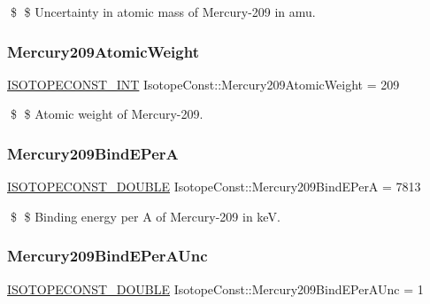\$ \$ Uncertainty in atomic mass of Mercury-\/209 in amu. \mbox{\label{group___isotope_const-_mercury-_hg209_ga2759cde1c7d4021583d5eea3d78fa6d4}} 
\subsubsection{\texorpdfstring{Mercury209\+Atomic\+Weight}{Mercury209AtomicWeight}}
{\footnotesize\ttfamily \mbox{\hyperlink{group___isotope_const-_macros_ga5f18360b3e99483a35c32d789e62621c}{I\+S\+O\+T\+O\+P\+E\+C\+O\+N\+S\+T\+\_\+\+I\+NT}} Isotope\+Const\+::\+Mercury209\+Atomic\+Weight = 209}

\$ \$ Atomic weight of Mercury-\/209. \mbox{\label{group___isotope_const-_mercury-_hg209_gab65d40aa9de348346799ced03ebb16e0}} 
\subsubsection{\texorpdfstring{Mercury209\+Bind\+E\+PerA}{Mercury209BindEPerA}}
{\footnotesize\ttfamily \mbox{\hyperlink{group___isotope_const-_macros_ga8f45a7272ce02c0b4c65c44636ed719a}{I\+S\+O\+T\+O\+P\+E\+C\+O\+N\+S\+T\+\_\+\+D\+O\+U\+B\+LE}} Isotope\+Const\+::\+Mercury209\+Bind\+E\+PerA = 7813}

\$ \$ Binding energy per A of Mercury-\/209 in keV. \mbox{\label{group___isotope_const-_mercury-_hg209_ga6002990cac6f5c6ce6a0f7fb5b6be560}} 
\subsubsection{\texorpdfstring{Mercury209\+Bind\+E\+Per\+A\+Unc}{Mercury209BindEPerAUnc}}
{\footnotesize\ttfamily \mbox{\hyperlink{group___isotope_const-_macros_ga8f45a7272ce02c0b4c65c44636ed719a}{I\+S\+O\+T\+O\+P\+E\+C\+O\+N\+S\+T\+\_\+\+D\+O\+U\+B\+LE}} Isotope\+Const\+::\+Mercury209\+Bind\+E\+Per\+A\+Unc = 1}

